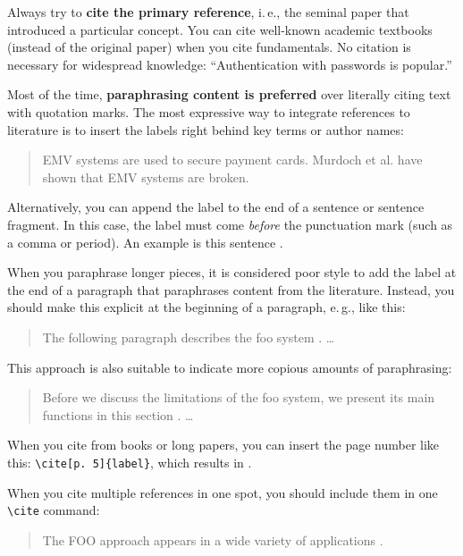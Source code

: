 Always try to \textbf{cite the primary reference},%
i.\,e., the seminal paper that introduced a particular concept. You can cite well-known academic textbooks (instead of the original paper) when you cite fundamentals. No citation is necessary for widespread knowledge: ``Authentication with passwords is popular.''

Most of the time, \textbf{paraphrasing content is preferred} over literally citing text with quotation marks. The most expressive way to integrate references to literature is to insert the labels right behind key terms or author names:
\begin{quote}
  EMV systems \cite{anderson_ross_emv:_2014} are used to secure payment cards. Murdoch et al. \cite{murdoch_steven_j._chip_2010} have shown that EMV systems are broken.
\end{quote}

Alternatively, you can append the label to the end of a sentence or sentence fragment. In this case, the label must come \emph{before} the punctuation mark (such as a comma or period). An example is this sentence \cite{Hintz02}.

When you paraphrase longer pieces, it is considered poor style to add the label at the end of a paragraph that paraphrases content from the literature. Instead, you should make this explicit at the beginning of a paragraph, e.\,g., like this:
\begin{quote}
  The following paragraph describes the foo system \cite{kou_weidong_secure_2003}. …
\end{quote}

This approach is also suitable to indicate more copious amounts of paraphrasing:
\begin{quote}
  Before we discuss the limitations of the foo system, we present its main functions in this section \cite{kou_weidong_secure_2003}. …
\end{quote}

When you cite from books or long papers, you can insert the page number like this: \verb|\cite[p. 5]{label}|, which results in \cite[p. 5]{kou_weidong_secure_2003}.

When you cite multiple references in one spot, you should include them in one \verb|\cite| command:
\begin{quote}
  The FOO approach appears in a wide variety of applications \cite{murdoch_steven_j._chip_2010,anderson_ross_emv:_2014,kou_weidong_secure_2003}.
\end{quote}

